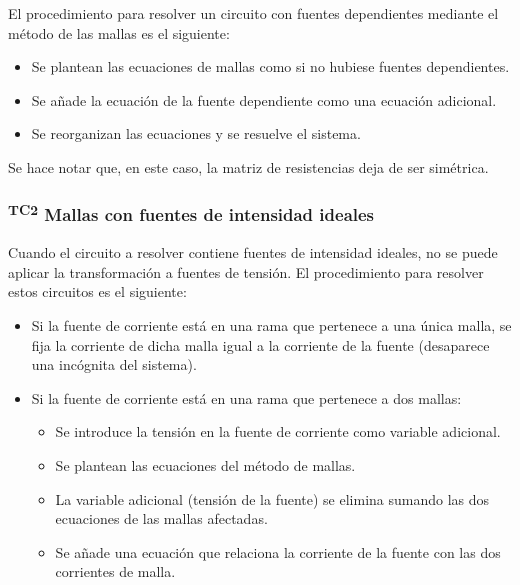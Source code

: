 El procedimiento para resolver un circuito con fuentes dependientes
mediante el método de las mallas es el siguiente:

\begin{itemize}
\item Se plantean las ecuaciones de mallas como si no hubiese fuentes
  dependientes.
\item Se añade la ecuación de la fuente dependiente como una ecuación
  adicional.
\item Se reorganizan las ecuaciones y se resuelve el sistema.
\end{itemize}

Se hace notar que, en este caso, la matriz de resistencias deja de ser
simétrica.

\subsubsection{\textsuperscript{TC2} Mallas con fuentes de intensidad
  ideales}
\label{sec:mallas-fuentes-corriente}

Cuando el circuito a resolver contiene fuentes de intensidad ideales,
no se puede aplicar la transformación a fuentes de tensión. El
procedimiento para resolver estos circuitos es el siguiente:
\begin{itemize}
\item Si la fuente de corriente está en una rama que pertenece a una
  única malla, se fija la corriente de dicha malla igual a la
  corriente de la fuente (desaparece una incógnita del sistema).
\item Si la fuente de corriente está en una rama que pertenece a dos
  mallas:
  \begin{itemize}
  \item Se introduce la tensión en la fuente de corriente como
    variable adicional.
  \item Se plantean las ecuaciones del método de mallas.
  \item La variable adicional (tensión de la fuente) se elimina
    sumando las dos ecuaciones de las mallas afectadas.
  \item Se añade una ecuación que relaciona la corriente de la fuente
    con las dos corrientes de malla.
  \end{itemize}
\end{itemize}

